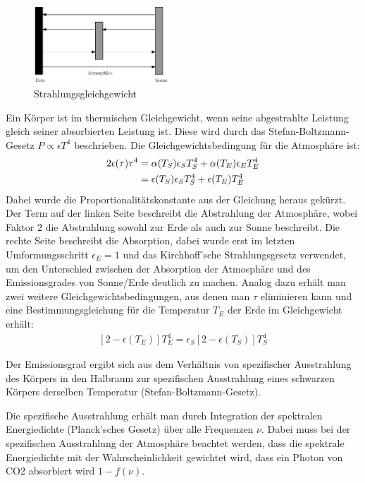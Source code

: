 \documentclass[10pt,a4paper]{article}
\begin{document}
\begin{figure}
\centering
\includegraphics[width=0.45\textwidth]{./figures/strahlungsgleichgewicht.eps}
\caption{Strahlungsgleichgewicht}
\label{fig:strahlungsgleichgewicht}
\end{figure}
Ein Körper ist im thermischen Gleichgewicht, wenn seine abgestrahlte Leistung
gleich seiner absorbierten Leistung ist. Diese wird durch das Stefan-Boltzmann-Gesetz
$P \propto \epsilon T^4$ beschrieben. Die Gleichgewichtsbedingung für die Atmosphäre ist:
\begin{align}
	2\epsilon(\tau)\tau^4 &= \alpha(T_S) \epsilon_S T_S^4 + \alpha(T_E) \epsilon_E T_E^4 \notag \\ &=\epsilon(T_S) \epsilon_S T_S^4 + \epsilon(T_E) T_E^4
\end{align}
Dabei wurde die Proportionalitätskonstante aus der Gleichung heraus gekürzt.
Der Term auf der linken Seite beschreibt die Abstrahlung der Atmosphäre, wobei
Faktor $2$ die Abstrahlung sowohl zur Erde als auch zur Sonne beschreibt.
Die rechte Seite beschreibt die Absorption, dabei wurde erst im letzten
Umformungsschritt $\epsilon_E = 1$ und das Kirchhoff'sche Strahlungsgesetz verwendet,
um den Unterschied zwischen der Absorption der Atmosphäre und des Emissionsgrades von
Sonne/Erde deutlich zu machen.
Analog dazu erhält man zwei weitere Gleichgewichtsbedingungen, aus denen man
$\tau$ eliminieren kann und eine Bestimmungsgleichung für die Temperatur $T_E$
der Erde im Gleichgewicht erhält:
\begin{align}
\left[2-\epsilon(T_E)\right]T_E^4=\epsilon_S\left[2-\epsilon(T_S)\right]T_S^4
\label{eqn:gleichgewicht}
\end{align}

Der Emissionsgrad ergibt sich aus dem Verhältnis von spezifischer Ausstrahlung des Körpers in den Halbraum zur spezifischen Ausstrahlung eines schwarzen Körpers derselben Temperatur (Stefan-Boltzmann-Gesetz). 

Die spezifische Ausstrahlung erhält man durch Integration der spektralen Energiedichte (Planck'sches Gesetz) über alle Frequenzen $\nu$. Dabei muss bei der spezifischen Ausstrahlung der Atmosphäre beachtet werden, dass die spektrale Energiedichte mit der Wahrscheinlichkeit gewichtet wird, dass ein Photon von CO2 absorbiert wird $1-f(\nu)$.
\end{document}
